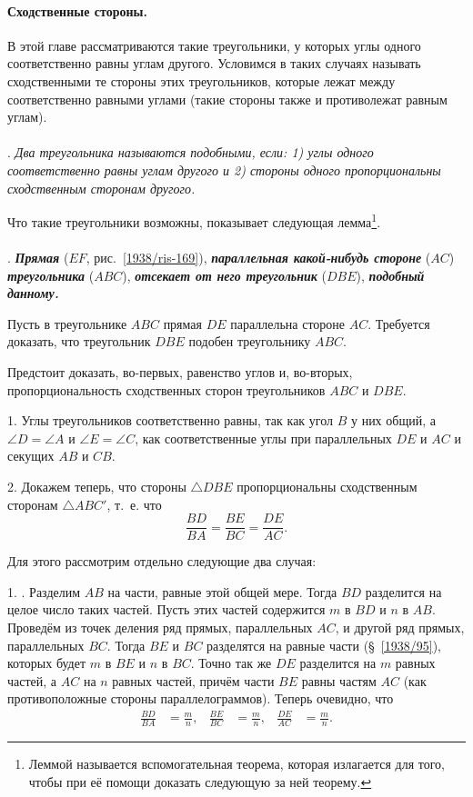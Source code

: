 \documentclass[oneside]{book}
\begin{document}
\paragraph{Сходственные стороны.}\label{1938/157} %
В этой главе рассматриваются такие треугольники, у которых углы одного соответственно равны углам другого.
Условимся в таких случаях называть сходственными те стороны этих треугольников, которые лежат между соответственно равными углами (такие стороны также и противолежат равным углам).

\paragraph{}\label{1938/158}
.
\emph{Два треугольника называются подобными, если:
1) углы одного соответственно равны углам другого и 2) стороны одного пропорциональны сходственным сторонам другого.}

Что такие треугольники возможны, показывает следующая лемма\footnote{Леммой называется вспомогательная теорема, которая излагается для того, чтобы при её помощи доказать следующую за ней теорему.}.

\paragraph{}\label{1938/159}
.
\textbf{\emph{Прямая}} ($EF$, рис.~\ref{1938/ris-169}), \textbf{\emph{параллельная какой-нибудь стороне}} ($AC$) \textbf{\emph{треугольника}} ($ABC$), \textbf{\emph{отсекает от него треугольник}} ($DBE$), \textbf{\emph{подобный данному.}}

Пусть в треугольнике $ABC$ прямая $DE$ параллельна стороне $AC$.
Требуется доказать, что треугольник $DBE$ подобен треугольнику $ABC$.

Предстоит доказать, во-первых, равенство углов и, во-вторых, пропорциональность сходственных сторон треугольников $ABC$ и $DBE$.

1.
Углы треугольников соответственно равны, так как угол $B$ у них общий, а $\angle D = \angle A$ и $\angle E= \angle C$, как соответственные углы при параллельных $DE$ и $AC$ и секущих $AB$ и $CB$.

2.
Докажем теперь, что стороны $\triangle DBE$ пропорциональны сходственным сторонам $\triangle ABC'$, т.~е. что
\[\frac{BD}{BA}=\frac{BE}{BC}=\frac{DE}{AC}.\]

Для этого рассмотрим отдельно следующие два случая:

1.
.
Разделим $AB$ на части, равные этой общей мере.
Тогда $BD$ разделится на целое число таких частей.
Пусть этих частей содержится $m$ в $BD$ и $n$ в $AB$.
Проведём из точек деления ряд прямых, параллельных $AC$, и другой ряд прямых, параллельных $BC$.
Тогда $BE$ и $BC$ разделятся на равные части (§~\ref{1938/95}), которых будет $m$ в $BE$ и $n$ в $BC$.
Точно так же $DE$ разделится на $m$ равных частей, а $AC$ на $n$ равных частей, причём части $BE$ равны частям $AC$ (как противоположные стороны параллелограммов).
Теперь очевидно, что
\begin{align*}
\frac{BD}{BA}&=\frac mn,
&
\frac{BE}{BC}&=\frac mn,
&
\frac{DE}{AC}&=\frac mn.
\end{align*}
\end{document}
